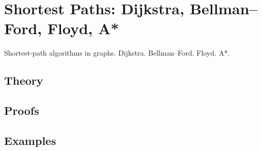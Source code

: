 
\section{Shortest Paths: Dijkstra, Bellman–Ford, Floyd, A*}
\label{sec:1.3.07-shortest-paths}

\begin{ticket}
Shortest-path algorithms in graphs. Dijkstra. Bellman–Ford. Floyd. A*.
\end{ticket}

\subsection*{Theory}

\subsection*{Proofs}

\subsection*{Examples}
